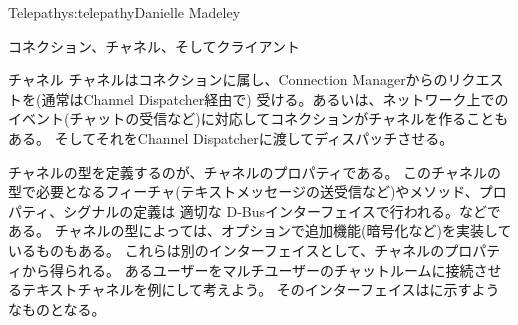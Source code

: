 \begin{aosachapter}{Telepathy}{s:telepathy}{Danielle Madeley}
\begin{aosasect1}{コネクション、チャネル、そしてクライアント}
\begin{aosasect2}{チャネル}
チャネルはコネクションに属し、Connection Managerからのリクエストを(通常はChannel Dispatcher経由で)
受ける。あるいは、ネットワーク上でのイベント(チャットの受信など)に対応してコネクションがチャネルを作ることもある。
そしてそれをChannel Dispatcherに渡してディスパッチさせる。

チャネルの型を定義するのが、チャネルのプロパティである。
このチャネルの型で必要となるフィーチャ(テキストメッセージの送受信など)やメソッド、プロパティ、シグナルの定義は
適切な D-Busインターフェイスで行われる。などである。
チャネルの型によっては、オプションで追加機能(暗号化など)を実装しているものもある。
これらは別のインターフェイスとして、チャネルのプロパティから得られる。
あるユーザーをマルチユーザーのチャットルームに接続させるテキストチャネルを例にして考えよう。
そのインターフェイスはに示すようなものとなる。


\end{aosasect2}
\end{aosasect1}
\end{aosachapter}
